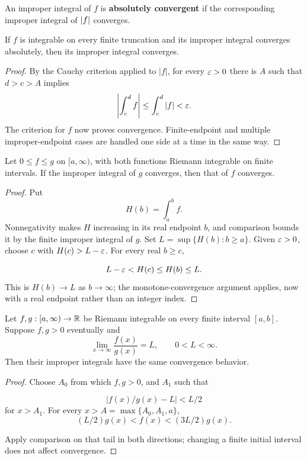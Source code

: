 \begin{definition}
An improper integral of $f$ is \textbf{absolutely convergent} if the
corresponding improper integral of $\lvert f\rvert$ converges.
\end{definition}
\begin{proposition}\label{prop:absolute-improper}
If $f$ is integrable on every finite truncation and its improper integral
converges absolutely, then its improper integral converges.
\end{proposition}
\begin{proof}
By the Cauchy criterion applied to $|f|$, for every $\varepsilon>0$ there is
$A$ such that $d>c>A$ implies
\[
\left|\int_c^d f\right|\leq\int_c^d|f|<\varepsilon.
\]
The criterion for $f$ now proves convergence. Finite-endpoint and multiple
improper-endpoint cases are handled one side at a time in the same way.
\end{proof}

\begin{theorem}
\label{thm:improper-comparison}
Let $0\leq f\leq g$ on $[a,\infty)$, with both functions Riemann integrable on finite intervals. If the improper integral of $g$ converges, then that of $f$ converges.
\end{theorem}
\begin{proof}
Put
\[
H(b)=\int_a^b f.
\]
 Nonnegativity makes $H$ increasing in its
real endpoint $b$, and comparison bounds it by the finite improper
integral of $g$. Set $L=\sup\{H(b):b\geq a\}$. Given $\varepsilon>0$,
choose $c$ with $H(c)>L-\varepsilon$. For every real $b\geq c$,

\[
L-\varepsilon<H(c)\leq H(b)\leq L.
\]
 This is $H(b)\to L$ as $b\to\infty$;
the monotone-convergence argument applies, now with
a real endpoint rather than an integer index.
\end{proof}

\begin{corollary}
Let $f,g:[a,\infty)\to\mathbb{R}$ be Riemann integrable on every finite interval
$[a,b]$. Suppose $f,g>0$ eventually and
\[
\lim_{x\to\infty}\frac{f(x)}{g(x)}=L,
\qquad0<L<\infty.
\]
Then their improper integrals have the same convergence behavior.
\end{corollary}
\begin{proof}
Choose $A_0$ from which $f,g>0$, and $A_1$ such that

\[
|f(x)/g(x)-L|<L/2
\]
 for $x>A_1$. For every
$x>A=\max\{A_0,A_1,a\}$,
\[
(L/2)g(x)<f(x)<(3L/2)g(x).
\]

Apply comparison on that tail in both directions;
changing a finite initial interval does not affect convergence.
\end{proof}

